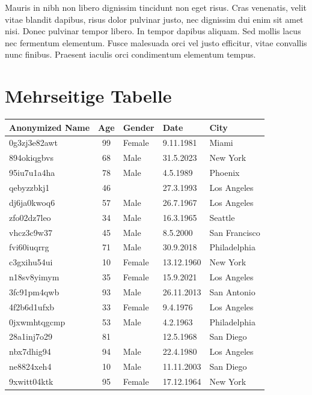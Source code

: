 \documentclass[a4paper, 12pt, notitlepage]{report}
\begin{document}
    Mauris in nibh non libero dignissim tincidunt non eget risus. Cras venenatis, velit vitae blandit dapibus, risus dolor pulvinar justo, nec dignissim dui enim sit amet nisi. Donec pulvinar tempor libero. In tempor dapibus aliquam. Sed mollis lacus nec fermentum elementum. Fusce malesuada orci vel justo efficitur, vitae convallis nunc finibus. Praesent iaculis orci condimentum elementum tempus.

    \chapter{Mehrseitige Tabelle}

    \begin{longtable}{l c l l l}\toprule
        Anonymized Name & Age & Gender & Date & City \\\midrule\endhead %
        \bottomrule\endfoot %
        0g3zj3e82awt & 99 & Female & 9.11.1981 & Miami \\
        894okiqgbvs & 68 & Male & 31.5.2023 & New York \\
        95iu7u1a4ha & 78 & Male & 4.5.1989 & Phoenix \\
        qebyzzbkj1 & 46 &  & 27.3.1993 & Los Angeles \\
        dj6ja0kwoq6 & 57 & Male & 26.7.1967 & Los Angeles \\
        zfo02dz7leo & 34 & Male & 16.3.1965 & Seattle \\
        vhcz3c9w37 & 45 & Male & 8.5.2000 & San Francisco \\
        fvi60iuqrrg & 71 & Male & 30.9.2018 & Philadelphia \\
        c3gxihu54ui & 10 & Female & 13.12.1960 & New York \\
        n18sv8yimym & 35 & Female & 15.9.2021 & Los Angeles \\
        3fc91pm4qwb & 93 & Male & 26.11.2013 & San Antonio \\
        4f2b6d1ufxb & 33 & Female & 9.4.1976 & Los Angeles \\
        0jxwmhtqgcmp & 53 & Male & 4.2.1963 & Philadelphia \\
        28a1inj7o29 & 81 &  & 12.5.1968 & San Diego \\
        nbx7dhig94 & 94 & Male & 22.4.1980 & Los Angeles \\
        ne8824xeh4 & 10 & Male & 11.11.2003 & San Diego \\
        9xwitt04ktk & 95 & Female & 17.12.1964 & New York \\

\end{longtable}
\end{document}
